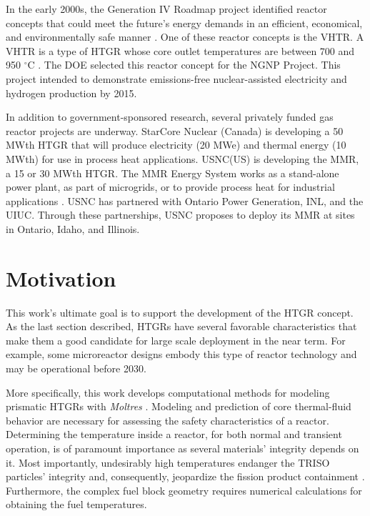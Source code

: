 In the early 2000s, the Generation IV Roadmap project \cite{doe-ne_technology_2002} identified reactor concepts that could meet the future's energy demands in an efficient, economical, and environmentally safe manner \cite{macdonald_ngnp_2003}.
One of these reactor concepts is the \gls{VHTR}.
A \gls{VHTR} is a type of HTGR whose core outlet temperatures are between 700 and 950 $^{\circ}$C \cite{gif_gif_2019}.
The \gls{DOE} selected this reactor concept for the \gls{NGNP} Project.
This project intended to demonstrate emissions-free nuclear-assisted electricity and hydrogen production by 2015.

In addition to government-sponsored research, several privately funded gas reactor projects are underway.
StarCore Nuclear \cite{star_core_nuclear_star_2015} (Canada) is developing a 50 MWth HTGR that will produce electricity (20 MWe) and thermal energy (10 MWth) for use in process heat applications.
\gls{USNC}(US) \cite{usnc_mmr_2019} is developing the \gls{MMR}, a 15 or 30 MWth HTGR.
The MMR Energy System works as a stand-alone power plant, as part of microgrids, or to provide process heat for industrial applications \cite{world_nuclear_news_micro_2020}.
USNC has partnered with Ontario Power Generation, \gls{INL}, and the \gls{UIUC}.
Through these partnerships, USNC proposes to deploy its MMR at sites in Ontario, Idaho, and Illinois.

\section{Motivation}

This work's ultimate goal is to support the development of the HTGR concept.
As the last section described, HTGRs have several favorable characteristics that make them a good candidate for large scale deployment in the near term.
For example, some microreactor designs embody this type of reactor technology and may be operational before 2030.

More specifically, this work develops computational methods for modeling prismatic \glspl{HTGR} with \textit{Moltres} \cite{lindsay_introduction_2018}.
Modeling and prediction of core thermal-fluid behavior are necessary for assessing the safety characteristics of a reactor.
Determining the temperature inside a reactor, for both normal and transient operation, is of paramount importance as several materials' integrity depends on it.
Most importantly, undesirably high temperatures endanger the TRISO particles' integrity and, consequently, jeopardize the fission product containment \cite{tak_numerical_2008}.
Furthermore, the complex fuel block geometry requires numerical calculations for obtaining the fuel temperatures.

